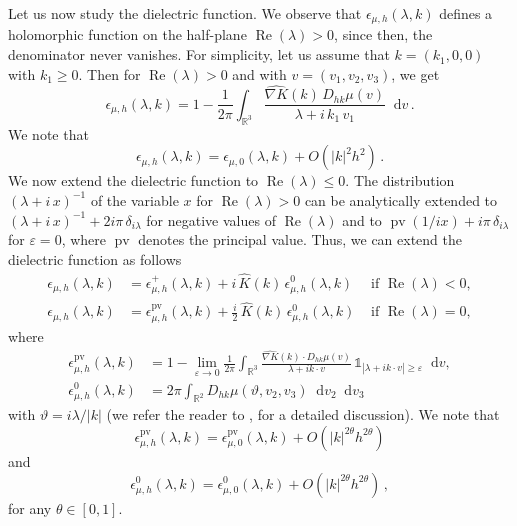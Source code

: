 \documentclass[a4paper,12pt]{amsart} %
\theoremstyle{plain}
\theoremstyle{definition}
\newcommand		{\RR}		{\mathbb R}			%
\newcommand		{\R}		{\RR}
\newcommand		{\Rd}		{\R^3}
\newcommand		{\lt}			{\left}				%
\newcommand		{\rt}			{\right}			%
\renewcommand	{\(}			{\lt(}
\renewcommand	{\)}			{\rt)}
\newcommand		{\n}[1]			{\lt\lvert{#1}\rt\rvert}	%
\newcommand		{\indic}	{\mathds{1}}		%
\renewcommand		{\d}		{\mathop{}\!\mathrm{d}}		%
\DeclareMathOperator{\pv}		{pv}
\DeclareMathOperator{\re}		{Re}				%
\renewcommand	{\Re}[1]		{\re\!\( #1 \)}		%
\newcommand		{\intd}			{\int_{\Rd}}
\newcommand		{\eps}			{\varepsilon}
\newcommand	{\h}			{h}
\begin{document}
	Let us now study the dielectric function. We observe that $\epsilon_{\mu,\h}(\lambda,k)$ defines a holomorphic function on the half-plane $\Re{\lambda}>0$, since then, the denominator never vanishes. 
	For simplicity, let us assume that $k = (k_1,0,0)$ with $k_1\geq 0$. Then for $\Re{\lambda}>0$ and with $v=(v_1,v_2,v_3)$, we get
	\begin{equation*}
		\epsilon_{\mu,\h}(\lambda,k) = 1 - \frac{1}{2\pi}\intd \frac{\widehat{\nabla K}(k)\, D_{h k} \mu(v)}{\lambda + i\,k_1\,v_1} \d v\, .
	\end{equation*}
	We note that
	\begin{equation*}
		\epsilon_{\mu,\h}(\lambda,k) = \epsilon_{\mu,0}(\lambda,k) + O(\n{k}^2h^2) \, .
	\end{equation*}
	We now extend the dielectric function to $\Re \lambda \le 0$. The distribution $(\lambda + i\, x)^{-1}$ of the variable $x$ for $\Re{\lambda} > 0$ can be analytically extended to $(\lambda + i\, x)^{-1} + 2 i \pi\, \delta_{i\lambda}$ for negative values of $\Re{\lambda}$ and to $\pv(1/ix) + i \pi \,\delta_{i\lambda}$ for $\eps = 0$, where $\pv$ denotes the principal value. Thus, we can extend the dielectric function as follows
	\begin{align}
		\epsilon_{\mu,\h}(\lambda,k) &= \epsilon_{\mu,\h}^+(\lambda,k) + i\,\widehat{K}(k) \,\epsilon_{\mu,\h}^0(\lambda,k)
		& \text{ if } \Re{\lambda} < 0,
		\\\label{eq:eps_zero}
		\epsilon_{\mu,\h}(\lambda,k) &= \epsilon_{\mu,\h}^\text{pv}(\lambda,k) + \frac{i}{2}\,\widehat{K}(k) \,\epsilon_{\mu,\h}^0(\lambda,k)
		& \text{ if } \Re{\lambda} = 0,
	\end{align}
	where
	\begin{align*}
		\epsilon_{\mu,\h}^\text{pv}(\lambda,k) 
		&= 1 - \lim_{\eps\to 0}\frac{1}{2\pi}\intd \frac{\widehat{\nabla K}(k)\cdot D_{h k}\mu(v)}{\lambda + i k\cdot v}\, \indic_{\n{\lambda + ik\cdot v}\geq \eps}\d v,
		\\
		\epsilon_{\mu,\h}^0(\lambda,k) &= 2\pi\int_{\R^2} D_{h k} \mu(\vartheta,v_2,v_3) \d v_2 \d v_3 
	\end{align*}
	with $\vartheta = i \lambda/|k|$ (we refer the reader to \cite[p.~26]{schekochihin_lectures_2023}, for a detailed discussion). We note that
	\begin{equation*}
		\epsilon_{\mu,\h}^\text{pv}(\lambda,k) = \epsilon_{\mu,0}^\text{pv}(\lambda,k) + O(\n{k}^{2\theta} h^{2\theta})
	\end{equation*}
	and
	\begin{equation*}
		\epsilon_{\mu,\h}^0(\lambda,k) = \epsilon_{\mu,0}^0(\lambda,k) + O(\n{k}^{2\theta} h^{2\theta}) \, ,
	\end{equation*}
	for any $\theta\in[0,1]$.
\end{document}
